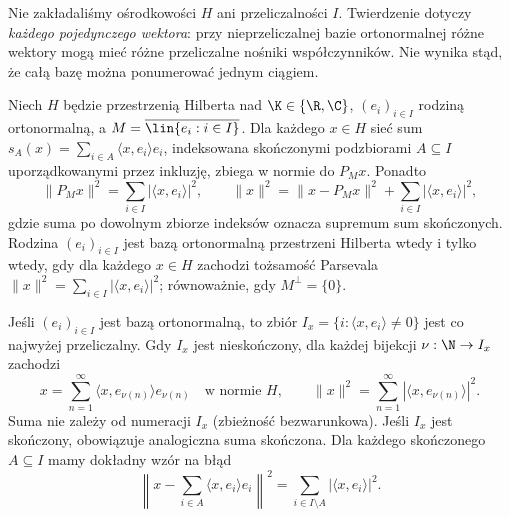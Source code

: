 \begin{uwaga}
\label{rem:fourier-countability13}
Nie zakładaliśmy ośrodkowości $H$ ani przeliczalności $I$.
Twierdzenie dotyczy \emph{każdego pojedynczego wektora}:
przy nieprzeliczalnej bazie ortonormalnej różne wektory mogą
mieć różne przeliczalne nośniki współczynników. Nie wynika
stąd, że całą bazę można ponumerować jednym ciągiem.
\end{uwaga}

\begin{twierdzenie}
\label{thm:parseval13}
\label{cor:fourier-enumeration13}
Niech $H$ będzie przestrzenią Hilberta nad $\K\in\{\R,\C\}$,
$(e_i)_{i\in I}$ rodziną ortonormalną, a
$M=\overline{\lin\{e_i:i\in I\}}$. Dla każdego $x\in H$
sieć sum $s_A(x)=\sum_{i\in A}\langle x,e_i\rangle e_i$,
indeksowana skończonymi podzbiorami $A\subseteq I$ uporządkowanymi
przez inkluzję, zbiega w normie do $P_Mx$. Ponadto
\[
 \|P_Mx\|^2=\sum_{i\in I}|\langle x,e_i\rangle|^2,
 \qquad
 \|x\|^2=\|x-P_Mx\|^2+
               \sum_{i\in I}|\langle x,e_i\rangle|^2,
\]
gdzie suma po dowolnym zbiorze indeksów oznacza supremum
sum skończonych. Rodzina $(e_i)_{i\in I}$ jest bazą ortonormalną
przestrzeni Hilberta wtedy i tylko wtedy, gdy dla każdego $x\in H$
zachodzi tożsamość Parsevala $\|x\|^2=\sum_{i\in I}
|\langle x,e_i\rangle|^2$; równoważnie, gdy
$M^\perp=\{0\}$.

Jeśli $(e_i)_{i\in I}$ jest bazą ortonormalną, to zbiór
$I_x=\{i:\langle x,e_i\rangle\ne0\}$ jest co najwyżej
przeliczalny. Gdy $I_x$ jest nieskończony, dla każdej bijekcji
$\nu:\N\to I_x$ zachodzi
\[
 x=\sum_{n=1}^{\infty}\langle x,e_{\nu(n)}\rangle e_{\nu(n)}
 \quad\text{w normie $H$},\qquad
 \|x\|^2=\sum_{n=1}^{\infty}|\langle x,e_{\nu(n)}\rangle|^2.
\]
Suma nie zależy od numeracji $I_x$ (zbieżność bezwarunkowa).
Jeśli $I_x$ jest skończony, obowiązuje analogiczna suma skończona.
Dla każdego skończonego $A\subseteq I$ mamy dokładny wzór na błąd
\[
 \left\|x-\sum_{i\in A}\langle x,e_i\rangle e_i\right\|^2
 =\sum_{i\in I\setminus A}|\langle x,e_i\rangle|^2.
\]
\end{twierdzenie}
